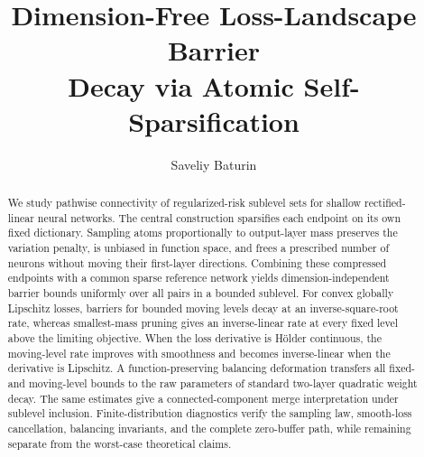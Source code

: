 \documentclass[smallextended,envcountsect]{svjour3}
\begin{document}
\title{Dimension-Free Loss-Landscape Barrier\\
Decay via Atomic Self-Sparsification}

\author{Saveliy Baturin}


\date{}

\begingroup
\hfuzz=0.5pt %
\maketitle
\endgroup

\begin{abstract}
We study pathwise connectivity of regularized-risk sublevel sets for shallow
rectified-linear neural networks. The central construction sparsifies each
endpoint on its own fixed dictionary. Sampling atoms proportionally to
output-layer mass preserves the variation penalty, is unbiased in function
space, and frees a prescribed number of neurons without moving their
first-layer directions. Combining these compressed endpoints with a common
sparse reference network yields dimension-independent barrier bounds uniformly
over all pairs in a bounded sublevel. For convex globally Lipschitz losses,
barriers for bounded moving levels decay at an inverse-square-root rate, whereas
smallest-mass pruning gives an inverse-linear rate at every fixed level above
the limiting objective. When the loss derivative is H\"older continuous, the
moving-level rate improves with smoothness and becomes inverse-linear when the
derivative is Lipschitz. A function-preserving balancing deformation transfers
all fixed- and moving-level bounds to the raw parameters of standard two-layer
quadratic weight decay. The same estimates give a connected-component merge
interpretation under sublevel inclusion. Finite-distribution diagnostics verify
the sampling law, smooth-loss cancellation, balancing invariants, and the
complete zero-buffer path, while remaining separate from the worst-case
theoretical claims.
\end{abstract}


\end{document}
